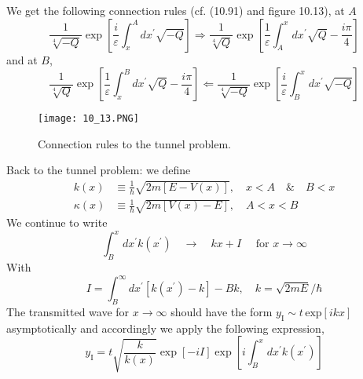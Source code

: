 We get the following connection rules (cf. (10.91) and figure 10.13), at $A$
\begin{equation}
    \frac{1}{\sqrt[4]{-Q}} \exp \left[\frac{i}{\varepsilon} \int_{x}^{A} d x^{\prime} \sqrt{-Q}\right] \Longrightarrow \frac{1}{\sqrt[4]{Q}} \exp \left[\frac{1}{\varepsilon} \int_{A}^{x} d x^{\prime} \sqrt{Q}-\frac{i \pi}{4}\right]
    \end{equation}
and at $B$,
\begin{equation}
    \frac{1}{\sqrt[4]{Q}} \exp \left[\frac{1}{\varepsilon} \int_{x}^{B} d x^{\prime} \sqrt{Q}-\frac{i \pi}{4}\right] \Longleftarrow \frac{1}{\sqrt[4]{-Q}} \exp \left[\frac{i}{\varepsilon} \int_{B}^{x} d x^{\prime} \sqrt{-Q}\right]
    \end{equation}
\begin{figure}[ht]
    \begin{minipage}{0.5\textwidth}
        \centering
        \texttt{[image: 10\_13.PNG]}
    \end{minipage}
    \begin{minipage}{0.5\textwidth}
        \caption{Connection rules to the tunnel problem.}
    \end{minipage}
\end{figure}
Back to the tunnel problem: we define
\begin{equation}
\begin{aligned} k(x) & \equiv \frac{1}{\hbar} \sqrt{2 m[E-V(x)]}, \quad x<A \quad \& \quad B<x \\ \kappa(x) & \equiv \frac{1}{\hbar} \sqrt{2 m[V(x)-E]}, \quad A<x<B \end{aligned}
\end{equation}
We continue to write
\begin{equation}
    \int_{B}^{x} d x^{\prime} k\left(x^{\prime}\right) \quad \rightarrow \quad k x+I \quad \text { for } x \rightarrow \infty
    \end{equation}
With
\begin{equation}
    I=\int_{B}^{\infty} d x^{\prime}\left[k\left(x^{\prime}\right)-k\right]-B k, \quad k=\sqrt{2 m E} / \hbar
    \end{equation}
The transmitted wave for $x\rightarrow\infty$ should have the form $ y_{\text{I}}\sim t\,\text{exp} [ikx]$ asymptotically and accordingly we apply the following expression,
\begin{equation}
    y_{\mathrm{I}}=t \sqrt{\frac{k}{k(x)}} \exp [-i I] \exp \left[i \int_{B}^{x} d x^{\prime} k\left(x^{\prime}\right)\right]
    \end{equation}
